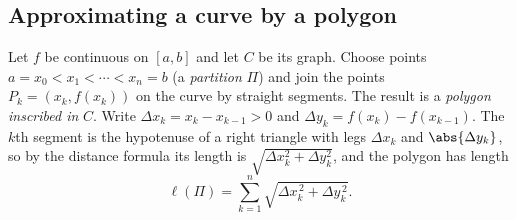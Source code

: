\documentclass[11pt]{article}
\begin{document}
\subsection*{Approximating a curve by a polygon}

Let $f$ be continuous on $[a,b]$ and let $C$ be its graph. Choose points $a=x_0<x_1<\cdots<x_n=b$ (a \emph{partition} $\Pi$) and join the points $P_k=(x_k,f(x_k))$ on the curve by straight segments. The result is a \emph{polygon inscribed in} $C$. Write $\Delta x_k=x_k-x_{k-1}>0$ and $\Delta y_k=f(x_k)-f(x_{k-1})$. The $k$th segment is the hypotenuse of a right triangle with legs $\Delta x_k$ and $\abs{\Delta y_k}$, so by the distance formula its length is $\sqrt{\Delta x_k^2+\Delta y_k^2}$, and the polygon has length
\[
\ell(\Pi)=\sum_{k=1}^n\sqrt{\Delta x_k^{\,2}+\Delta y_k^{\,2}} .
\]
\end{document}
